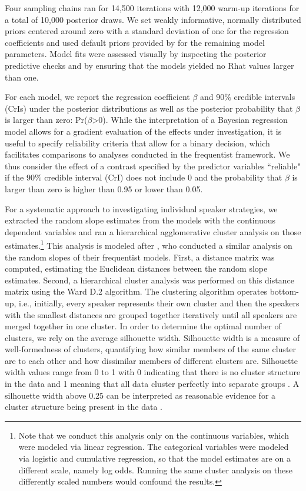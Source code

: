 Four sampling chains ran for 14,500 iterations with 12,000 warm-up iterations for a total of 10,000 posterior draws. We set weakly informative, normally distributed priors centered around zero with a standard deviation of one for the regression coefficients and used default priors provided by  for the remaining model parameters. Model fits were assessed visually by inspecting the posterior predictive checks and by ensuring that the models yielded no Rhat values larger than one.

For each model, we report the regression coefficient $\beta$ and 90\% credible intervals (CrIs) under the posterior distributions as well as the posterior probability that $\beta$ is larger than zero: Pr($\beta$\textgreater{}0). While the interpretation of a Bayesian regression model allows for a gradient evaluation of the effects under investigation, it is useful to specify reliability criteria that allow for a binary decision, which facilitates comparisons to analyses conducted in the frequentist framework. We thus consider the effect of a contrast specified by the predictor variables ``reliable" if the 90\% credible interval (CrI) does not include 0 and the probability that $\beta$ is larger than zero is higher than 0.95 or lower than 0.05. 

For a systematic approach to investigating individual speaker strategies, we extracted the random slope estimates from the models with the continuous dependent variables and ran a hierarchical agglomerative cluster analysis on those estimates.\footnote{Note that we conduct this analysis only on the continuous variables, which were modeled via linear regression. The categorical variables were modeled via logistic and cumulative regression, so that the model estimates are on a different scale, namely log odds. Running the same cluster analysis on these differently scaled numbers would confound the results.} This analysis is modeled after \citet{baumannWhatMakesWord2018}, who conducted a similar analysis on the random slopes of their frequentist models. First, a distance matrix was computed, estimating the Euclidean distances between the random slope estimates. Second, a hierarchical cluster analysis was performed on this distance matrix using the Ward D.2 algorithm. The clustering algorithm operates bottom-up, i.e., initially, every speaker represents their own cluster and then the speakers with the smallest distances are grouped together iteratively until all speakers are merged together in one cluster. In order to determine the optimal number of clusters, we rely on the average silhouette width. Silhouette width is a measure of well-formedness of clusters, quantifying how similar members of the same cluster are to each other and how dissimilar members of different clusters are. Silhouette width values range from 0 to 1 with 0 indicating that there is no cluster structure in the data and 1 meaning that all data cluster perfectly into separate groups \citep{levshinaHowLinguisticsData2015}. A silhouette width above 0.25 can be interpreted as reasonable evidence for a cluster structure being present in the data \citep[88]{kaufmanFindingGroupsData1990}. 


